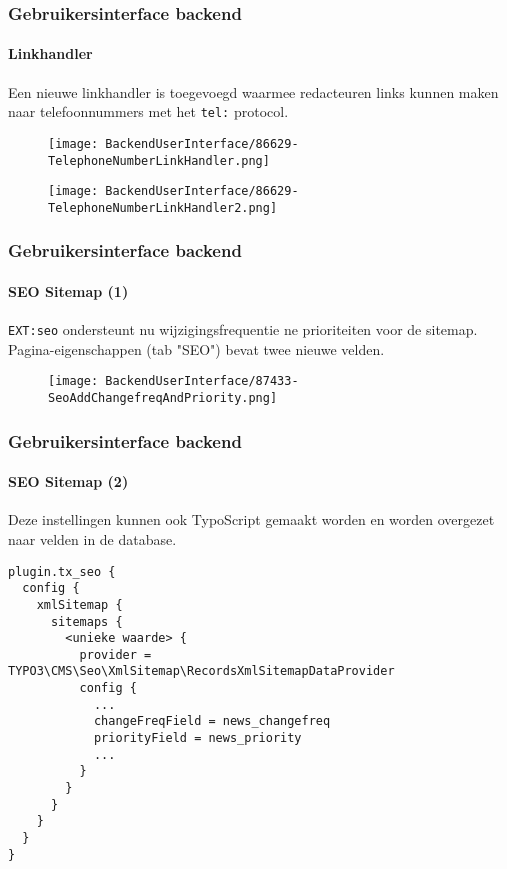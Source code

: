 
\begin{frame}[fragile]
	\frametitle{Gebruikersinterface backend}
	\framesubtitle{Linkhandler}

	Een nieuwe linkhandler is toegevoegd waarmee redacteuren links kunnen maken naar
	telefoonnummers met het \texttt{tel:} protocol.

	\begin{figure}
		\texttt{[image: BackendUserInterface/86629-TelephoneNumberLinkHandler.png]}
	\end{figure}

	\begin{figure}
		\texttt{[image: BackendUserInterface/86629-TelephoneNumberLinkHandler2.png]}
	\end{figure}

\end{frame}


\begin{frame}[fragile]
	\frametitle{Gebruikersinterface backend}
	\framesubtitle{SEO Sitemap (1)}

	\texttt{EXT:seo} ondersteunt nu wijzigingsfrequentie ne prioriteiten voor de sitemap.
	Pagina-eigenschappen (tab "SEO") bevat twee nieuwe velden.

	\begin{figure}
		\texttt{[image: BackendUserInterface/87433-SeoAddChangefreqAndPriority.png]}
	\end{figure}

\end{frame}


\begin{frame}[fragile]
	\frametitle{Gebruikersinterface backend}
	\framesubtitle{SEO Sitemap (2)}

	\lstset{basicstyle=\tiny\ttfamily}

    Deze instellingen kunnen ook TypoScript gemaakt worden en worden overgezet naar velden
    in de database.

	\begin{lstlisting}
plugin.tx_seo {
  config {
    xmlSitemap {
      sitemaps {
        <unieke waarde> {
          provider = TYPO3\CMS\Seo\XmlSitemap\RecordsXmlSitemapDataProvider
          config {
            ...
            changeFreqField = news_changefreq
            priorityField = news_priority
            ...
          }
        }
      }
    }
  }
}
	\end{lstlisting}

\end{frame}

